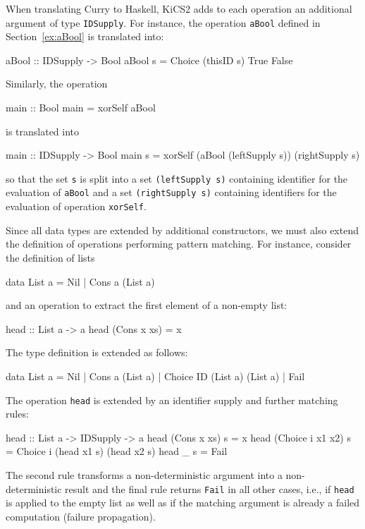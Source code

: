 \documentclass{llncs}
\newcommand{\code}[1]{\mbox{\small\texttt{#1}}}
\begin{document}
When translating Curry to Haskell, KiCS2 adds to each operation
an additional argument of type \code{IDSupply}.
For instance, the operation \code{aBool}
defined in Section~\ref{ex:aBool} is translated into:
\begin{haskell}
  aBool :: IDSupply -> Bool
  aBool s = Choice (thisID s) True False
\end{haskell}
Similarly, the operation
\begin{curry}
  main :: Bool
  main = xorSelf aBool
\end{curry}
is translated into
\begin{haskell}
  main :: IDSupply -> Bool
  main s = xorSelf (aBool (leftSupply s)) (rightSupply s)
\end{haskell}
so that the set \code{s} is split into a set \code{(leftSupply s)}
containing identifier for the evaluation of \code{aBool}
and a set \code{(rightSupply s)} containing identifiers
for the evaluation of operation \code{xorSelf}.

Since all data types are extended by additional constructors,
we must also extend the definition of operations performing
pattern matching. For instance, consider the definition of lists
\begin{curry}
  data List a = Nil | Cons a (List a)
\end{curry}
and an operation to extract the first element of a non-empty list:
\begin{curry}
  head :: List a -> a
  head (Cons x xs) = x
\end{curry}
The type definition is extended as follows:
\begin{haskell}
  data List a = Nil | Cons a (List a) | Choice ID (List a) (List a) | Fail
\end{haskell}
The operation \code{head} is extended by an identifier supply
and further matching rules:
\begin{haskell}
  head :: List a -> IDSupply -> a
  head (Cons x xs)      s = x
  head (Choice i x1 x2) s = Choice i (head x1 s) (head x2 s)
  head _                s = Fail
\end{haskell}
The second rule transforms a non-deterministic argument
into a non-deterministic result and
the final rule returns \code{Fail} in all other cases,
i.e., if \code{head} is
applied to the empty list as well as if the matching argument
is already a failed computation (failure propagation).
\end{document}
